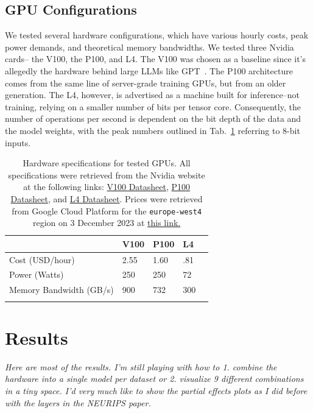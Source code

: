 \documentclass[conference]{IEEEtran}
\newcommand{\cm}[1]{\textit{{\color{blue}#1}}}
\begin{document}
\subsection{GPU Configurations}
We tested several hardware configurations, which have various hourly costs, peak power demands, and theoretical memory bandwidths. We tested three Nvidia cards-- the V100, the P100, and L4. The V100 was chosen as a baseline since it's allegedly the hardware behind large LLMs like GPT~\cite{}. The P100 architecture comes from the same line of server-grade training GPUs, but from an older generation. The L4, however, is advertised as a machine built for inference--not training, relying on a smaller number of bits per tensor core. Consequently, the number of operations per second is dependent on the bit depth of the data and the model weights, with the peak numbers outlined in Tab.~\ref{tab:hardware} referring to 8-bit inputs.
\begin{table}[h]
\begin{tabular}{lllll}
\hline
                        & V100   & P100   & L4    &  \\ \hline
Cost (USD/hour)          & 2.55 & 1.60 & .81 &  \\
Power (Watts)           & 250    & 250    & 72    &  \\
Memory Bandwidth (GB/s) & 900    & 732    & 300   &  \\ \hline
\label{tab:hardware}
\end{tabular}
\caption{Hardware specifications for tested GPUs. All specifications were retrieved from the Nvidia website at the following links: 
\href{https://images.nvidia.com/content/technologies/volta/pdf/volta-v100-datasheet-update-us-1165301-r5.pdf}{V100 Datasheet},
\href{https://images.nvidia.com/content/tesla/pdf/nvidia-tesla-p100-PCIe-datasheet.pdf}{P100 Datasheet}, and
\href{https://nvdam.widen.net/s/rvq98gbwsw/l4-datasheet-2595652}{L4 Datasheet}. Prices were retrieved from Google Cloud Platform for the \texttt{europe-west4} region on 3 December 2023 at \href{https://cloud.google.com/pricing/list}{this link.}
}
\end{table}

\section{Results}
\cm{Here are most of the results. I'm still playing with how to 1. combine the hardware into a single model per dataset or 2. visualize 9 different combinations in a tiny space. I'd very much like to show the partial effects plots as I did before with the layers in the NEURIPS paper.}
\end{document}

